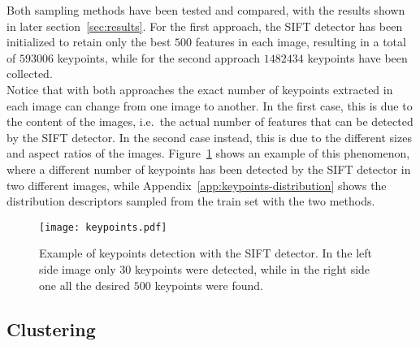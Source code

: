 \documentclass[../main.tex]{subfiles}
\begin{document}
Both sampling methods have been tested and compared, with the results shown in
later section~\ref{sec:results}. 
For the first approach, the SIFT detector has
been initialized to retain only the best $500$ features in each image, resulting in a total of $\num{593006}$ keypoints, while for the second approach $\num{1482434}$ keypoints have been collected.\\
Notice that with both approaches the exact number of keypoints extracted in each
image can change from one image to another.
In the first case, this is due to
the content of the images, i.e.\ the actual number of features that can be
detected by the SIFT detector.
In the second case instead, this is due to the different sizes and aspect ratios of the images. 
Figure~\ref{fig:keypoints-example} shows an example of this phenomenon, where a
different number of keypoints has been detected by the SIFT detector in two
different images, while Appendix~\ref{app:keypoints-distribution} shows the
distribution descriptors sampled from the train set with the two methods.

\begin{figure}[H]
  \centering
  \texttt{[image: keypoints.pdf]}
  \caption{Example of keypoints detection with the SIFT detector. In the left
  side image only $30$ keypoints were detected, while in the right side one all
the desired $500$ keypoints were found.}
  \label{fig:keypoints-example}
\end{figure}


\subsection{Clustering}\label{subsec:clustering}
\end{document}
